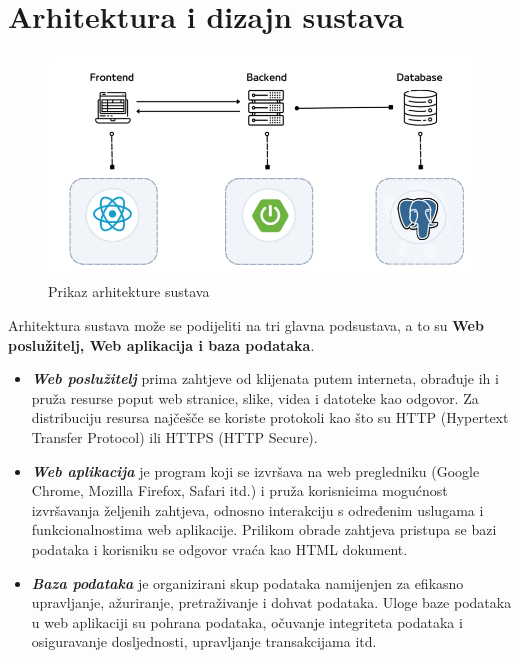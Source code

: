 \chapter{Arhitektura i dizajn sustava}

\begin{figure}[H]
	\includegraphics[scale=1]{slike/prikaz_arhitekture.png}
	\centering
	\caption{Prikaz arhitekture sustava}
\end{figure}

Arhitektura sustava može se podijeliti na tri glavna podsustava, a to su \textbf{Web poslužitelj, Web aplikacija i baza podataka}.
\begin{itemize}
	\item 	\textit{\textbf{Web poslužitelj}} prima zahtjeve od klijenata putem interneta, obrađuje ih i pruža resurse poput web stranice, slike, videa i datoteke kao odgovor. Za distribuciju resursa najčešče se koriste protokoli kao što su HTTP (Hypertext Transfer Protocol) ili HTTPS (HTTP Secure).
	\item 	\textit{\textbf{Web aplikacija}} je program koji se izvršava na web pregledniku (Google Chrome, Mozilla Firefox, Safari itd.) i pruža korisnicima mogućnost izvršavanja željenih zahtjeva, odnosno interakciju s određenim uslugama i funkcionalnostima web aplikacije. Prilikom obrade zahtjeva pristupa se bazi podataka i korisniku se odgovor vraća kao HTML dokument.
	\item 	\textit{\textbf{Baza podataka}} je organizirani skup podataka namijenjen za efikasno upravljanje, ažuriranje, pretraživanje i dohvat podataka. Uloge baze podataka u web aplikaciji su pohrana podataka, očuvanje integriteta podataka i osiguravanje dosljednosti, upravljanje transakcijama itd.
\end{itemize}

